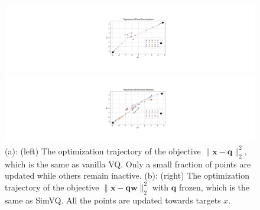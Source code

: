 \begin{figure}[t]
    \centering
    \begin{minipage}[b]{0.49\columnwidth}
        \centering
        \includegraphics[width=\columnwidth]{material/dynamic3.pdf}
    \end{minipage}
    \begin{minipage}[b]{0.49\columnwidth}
        \centering
        \includegraphics[width=\columnwidth]{material/dynamic2.pdf}
    \end{minipage}
    \caption{(a): (left) The optimization trajectory of the objective $\|\bm{x}-\bm{q}\|^2_2$, which is the same as vanilla VQ. Only a small fraction of points are updated while others remain inactive. (b): (right) The optimization trajectory of the objective $\|\bm{x}-\bm{q}\bm{w}\|^2_2$ with $\bm{q}$ frozen, which is the same as SimVQ. All the points are updated towards targets $x$.}
    \label{fig:optim1}
\end{figure}


